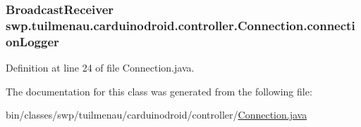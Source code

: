\subsubsection[{connection\+Logger}]{\setlength{\rightskip}{0pt plus 5cm}Broadcast\+Receiver swp.\+tuilmenau.\+carduinodroid.\+controller.\+Connection.\+connection\+Logger}\label{classswp_1_1tuilmenau_1_1carduinodroid_1_1controller_1_1_connection_a51750bd8eb6df23e9b7523d81b57324b}


Definition at line 24 of file Connection.\+java.



The documentation for this class was generated from the following file\+:\begin{DoxyCompactItemize}
\item 
bin/classes/swp/tuilmenau/carduinodroid/controller/\hyperlink{bin_2classes_2swp_2tuilmenau_2carduinodroid_2controller_2_connection_8java}{Connection.\+java}\end{DoxyCompactItemize}
